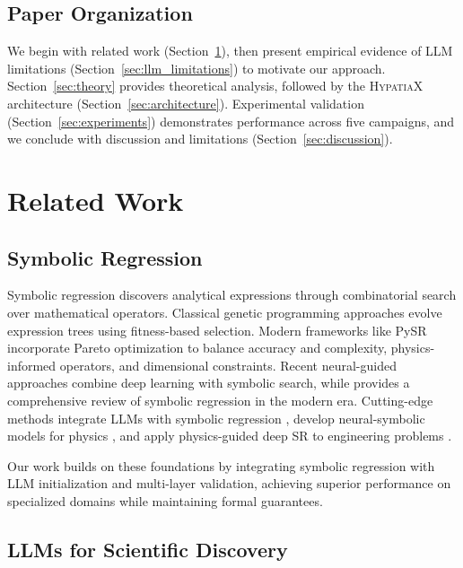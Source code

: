 \documentclass[twoside,11pt]{article}
\begin{document}
\subsection{Paper Organization}

We begin with related work (Section~\ref{sec:related}), then present empirical evidence of LLM limitations (Section~\ref{sec:llm_limitations}) to motivate our approach. Section~\ref{sec:theory} provides theoretical analysis, followed by the \textsc{HypatiaX} architecture (Section~\ref{sec:architecture}). Experimental validation (Section~\ref{sec:experiments}) demonstrates performance across five campaigns, and we conclude with discussion and limitations (Section~\ref{sec:discussion}).

\section{Related Work}
\label{sec:related}

\subsection{Symbolic Regression}

Symbolic regression discovers analytical expressions through combinatorial search over mathematical operators. Classical genetic programming approaches \citep{koza1992genetic,schmidt2009distilling} evolve expression trees using fitness-based selection. Modern frameworks like PySR \citep{cranmer2023interpretable} incorporate Pareto optimization to balance accuracy and complexity, physics-informed operators, and dimensional constraints. Recent neural-guided approaches \citep{petersen2021deep,udrescu2020aifeynman} combine deep learning with symbolic search, while \citet{cranmer2023symbolic} provides a comprehensive review of symbolic regression in the modern era. Cutting-edge methods integrate LLMs with symbolic regression \citep{taskin2026knowledge}, develop neural-symbolic models for physics \citep{ying2025physe2e}, and apply physics-guided deep SR to engineering problems \citep{zhang2026formula,senetakis2026symbolic}.

Our work builds on these foundations by integrating symbolic regression with LLM initialization and multi-layer validation, achieving superior performance on specialized domains while maintaining formal guarantees.

\subsection{LLMs for Scientific Discovery}
\end{document}
